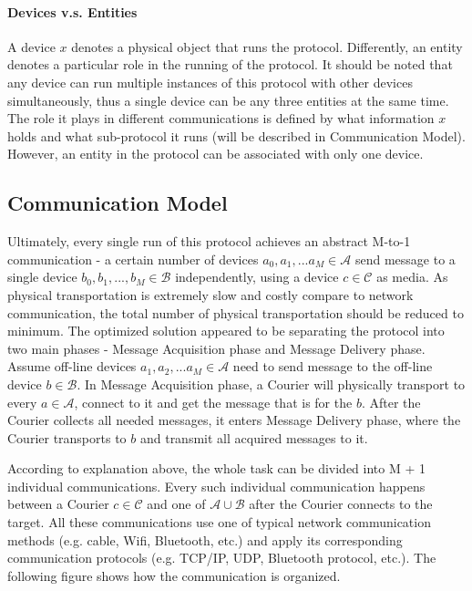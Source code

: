\paragraph{Devices v.s. Entities}
A device $x$ denotes a physical object that runs the protocol. Differently, an entity denotes a particular role in the running of the protocol. It should be noted that any  device can run multiple instances of this protocol with other devices simultaneously, thus a single device can be any three entities at the same time. The role it plays in different communications is defined by what information $x$ holds and what sub-protocol it runs (will be described in Communication Model). However, an entity in the protocol can be associated with only one device.

\subsection{Communication Model}
Ultimately, every single run of this protocol achieves an abstract M-to-1 communication - a certain number of devices $a_0, a_1, ... a_M \in \mathcal{A}$ send message to a single device $b_0, b_1, ..., b_M \in \mathcal{B}$ independently, using a device $c \in \mathcal{C}$ as media. As physical transportation is extremely slow and costly compare to network communication, the total number of physical transportation should be reduced to minimum. The optimized solution appeared to be separating the protocol into two main phases - Message Acquisition phase and Message Delivery phase. Assume off-line devices $a_1, a_2, ... a_M \in \mathcal{A}$ need to send message to the off-line device $b \in \mathcal{B}$. In Message Acquisition phase, a Courier will physically transport to every $a \in \mathcal{A}$, connect to it and get the message that is for the $b$. After the Courier collects all needed messages, it enters Message Delivery phase, where the Courier transports to $b$ and transmit all acquired messages to it.

According to explanation above, the whole task can be divided into M + 1 individual communications. Every such individual communication happens between a Courier $c \in \mathcal{C}$ and one of $\mathcal{A} \cup \mathcal{B}$ after the Courier connects to the target. All these communications use one of typical network communication methods (e.g. cable, Wifi, Bluetooth, etc.) and apply its corresponding communication protocols (e.g. TCP/IP, UDP, Bluetooth protocol, etc.). The following figure shows how the communication is organized.

